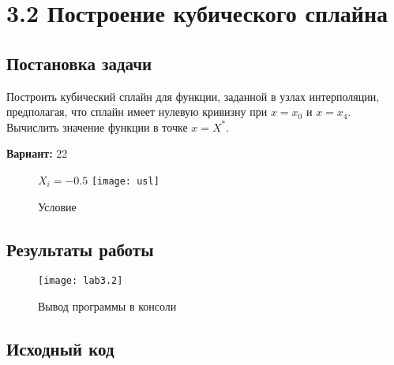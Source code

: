 \section* {3.2  Построение кубического сплайна}

\subsection{Постановка задачи}
Построить кубический сплайн для функции, заданной в узлах интерполяции, предполагая, что сплайн имеет нулевую кривизну при $x=x_0$ и $x=x_4$. Вычислить значение функции в точке $x=X^*$.
 

{\bfseries Вариант:} 22

\begin{figure}[h!]
$X_i=-0.5$
\centering
\texttt{[image: usl]}
\caption{Условие}
\end{figure}

\subsection{Результаты работы}
\begin{figure}[h!]
\centering
\texttt{[image: lab3.2]}
\caption{Вывод программы в консоли}
\end{figure}


\pagebreak

\subsection{Исходный код}
% 



% 
% 
% 
